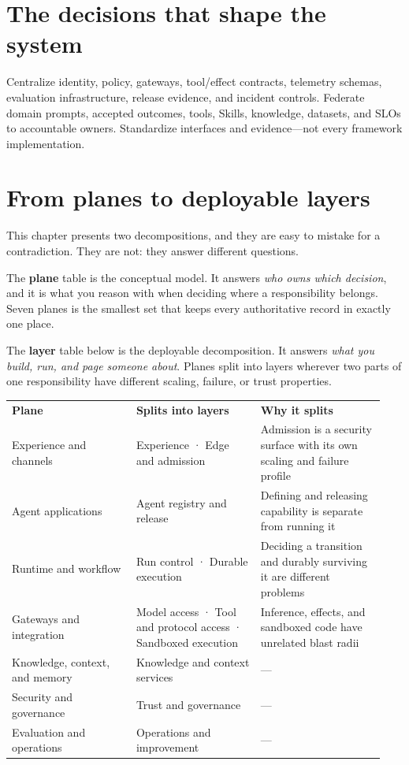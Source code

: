 \section{The decisions that shape the system}

Centralize identity, policy, gateways, tool/effect contracts, telemetry schemas, evaluation infrastructure, release evidence, and incident controls. Federate domain prompts, accepted outcomes, tools, Skills, knowledge, datasets, and SLOs to accountable owners. Standardize interfaces and evidence—not every framework implementation.\par

\section{From planes to deployable layers}

This chapter presents two decompositions, and they are easy to mistake for a contradiction. They are not: they answer different questions.\par

The \textbf{plane} table is the conceptual model. It answers \emph{who owns which decision}, and it is what you reason with when deciding where a responsibility belongs. Seven planes is the smallest set that keeps every authoritative record in exactly one place.\par

The \textbf{layer} table below is the deployable decomposition. It answers \emph{what you build, run, and page someone about}. Planes split into layers wherever two parts of one responsibility have different scaling, failure, or trust properties.\par

\BookTableStart
\small
\begin{tabular}{@{}Y{0.3133\linewidth}Y{0.3133\linewidth}Y{0.3133\linewidth}@{}}
\color{white}\bfseries Plane & \color{white}\bfseries Splits into layers & \color{white}\bfseries Why it splits \\
Experience and channels & Experience · Edge and admission & Admission is a security surface with its own scaling and failure profile \\
Agent applications & Agent registry and release & Defining and releasing capability is separate from running it \\
Runtime and workflow & Run control · Durable execution & Deciding a transition and durably surviving it are different problems \\
Gateways and integration & Model access · Tool and protocol access · Sandboxed execution & Inference, effects, and sandboxed code have unrelated blast radii \\
Knowledge, context, and memory & Knowledge and context services & — \\
Security and governance & Trust and governance & — \\
Evaluation and operations & Operations and improvement & — \\
\end{tabular}
\BookTableEnd

